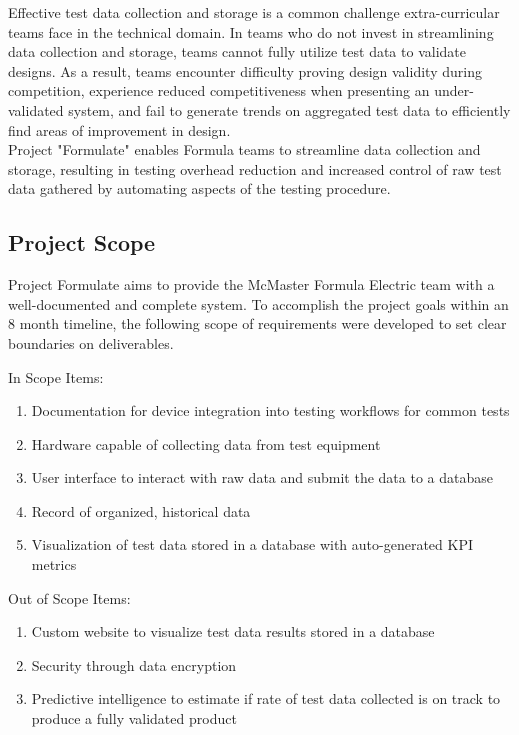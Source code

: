 \documentclass[12pt,titlepage]{article}
\begin{document}
Effective test data collection and storage is a common challenge extra-curricular teams face in the technical domain. In teams who do not invest in streamlining data collection and storage, teams cannot fully utilize test data to validate designs. As a result, teams encounter difficulty proving design validity during competition, experience reduced competitiveness when presenting an under-validated system, and fail to generate trends on aggregated test data to efficiently find areas of improvement in design. \\

Project "Formulate" enables Formula teams to streamline data collection and storage, resulting in testing overhead reduction and increased control of raw test data gathered by automating aspects of the testing procedure.\\

\subsection{Project Scope}

Project Formulate aims to provide the McMaster Formula Electric team with a well-documented and complete system. To accomplish the project goals within an 8 month timeline, the following scope of requirements were developed to set clear boundaries on deliverables.\\

\newpage

\noindent
  In Scope Items:
  \begin{enumerate}
\item Documentation for device integration into testing workflows for common tests
\item Hardware capable of collecting data from test equipment
\item User interface to interact with raw data and submit the data to a database
\item Record of organized, historical data
\item Visualization of test data stored in a database with auto-generated KPI metrics
  \end{enumerate}
  Out of Scope Items:

  \begin{enumerate}
\item Custom website to visualize test data results stored in a database
\item Security through data encryption
\item Predictive intelligence to estimate if rate of test data collected is on track to produce a fully validated product
  \end{enumerate}
\end{document}
